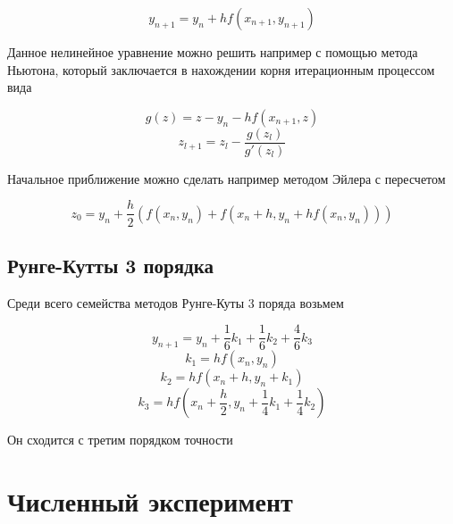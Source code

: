 \documentclass[11pt,a4paper,oneside]{article}
\begin{document}
$$ y_{n + 1} = y_n + h f(x_{n + 1}, y_{n + 1}) $$

Данное нелинейное уравнение можно решить например с помощью метода Ньютона, который заключается в нахождении корня итерационным процессом вида

$$ g(z) = z - y_n - h f(x_{n + 1}, z) $$
$$ z_{l + 1} = z_{l} - \frac{g(z_l)}{g'(z_l)} $$

Начальное приближение можно сделать например методом Эйлера с пересчетом

$$ z_0 = y_n + \frac{h}{2} \left( f(x_n, y_n) + f(x_n + h, y_n + h f(x_n, y_n)) \right)$$

\pagebreak
\subsection{Рунге-Кутты 3 порядка}

Среди всего семейства методов Рунге-Куты 3 поряда возьмем

$$ y_{n + 1} = y_n + \frac{1}{6} k_1
	+ \frac{1}{6} k_2
	+ \frac{4}{6} k_3 $$
$$ k_1 = h f(x_n, y_n) $$
$$ k_2 = h f(x_n + h, y_n + k_1) $$
$$ k_3 = h f(x_n + \frac{h}{2}, y_n + \frac{1}{4} k_1 + \frac{1}{4} k_2) $$

Он сходится с третим порядком точности

\section{Численный эксперимент}
\end{document}
